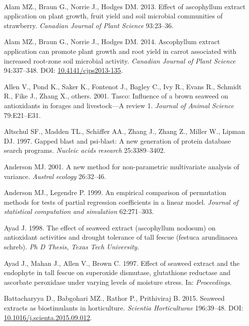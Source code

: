 \documentclass[11pt,]{article}
\begin{document}
~

\hypertarget{refs}{}
\hypertarget{ref-alam2013effect}{}
Alam MZ., Braun G., Norrie J., Hodges DM. 2013. Effect of ascophyllum
extract application on plant growth, fruit yield and soil microbial
communities of strawberry. \emph{Canadian Journal of Plant Science}
93:23--36.

\hypertarget{ref-Alam2014}{}
Alam MZ., Braun G., Norrie J., Hodges DM. 2014. Ascophyllum extract
application can promote plant growth and root yield in carrot associated
with increased root-zone soil microbial activity. \emph{Canadian Journal
of Plant Science} 94:337--348. DOI:
\href{https://doi.org/10.4141/cjps2013-135}{10.4141/cjps2013-135}.

\hypertarget{ref-allen2001tasco}{}
Allen V., Pond K., Saker K., Fontenot J., Bagley C., Ivy R., Evans R.,
Schmidt R., Fike J., Zhang X., others. 2001. Tasco: Influence of a brown
seaweed on antioxidants in forages and livestock---A review 1.
\emph{Journal of Animal Science} 79:E21--E31.

\hypertarget{ref-altschul1997gapped}{}
Altschul SF., Madden TL., Schäffer AA., Zhang J., Zhang Z., Miller W.,
Lipman DJ. 1997. Gapped blast and psi-blast: A new generation of protein
database search programs. \emph{Nucleic acids research} 25:3389--3402.

\hypertarget{ref-anderson2001new}{}
Anderson MJ. 2001. A new method for non-parametric multivariate analysis
of variance. \emph{Austral ecology} 26:32--46.

\hypertarget{ref-anderson1999empirical}{}
Anderson MJ., Legendre P. 1999. An empirical comparison of permutation
methods for tests of partial regression coefficients in a linear model.
\emph{Journal of statistical computation and simulation} 62:271--303.

\hypertarget{ref-ayad1998effect}{}
Ayad J. 1998. The effect of seaweed extract (ascophyllum nodosum) on
antioxidant activities and drought tolerance of tall fescue (festuca
arundinacea schreb). \emph{Ph D Thesis, Texas Tech University}.

\hypertarget{ref-ayad1997effect}{}
Ayad J., Mahan J., Allen V., Brown C. 1997. Effect of seaweed extract
and the endophyte in tall fescue on superoxide dismutase, glutathione
reductase and ascorbate peroxidase under varying levels of moisture
stress. In: \emph{Proceedings}.

\hypertarget{ref-Battacharyya2015}{}
Battacharyya D., Babgohari MZ., Rathor P., Prithiviraj B. 2015. Seaweed
extracts as biostimulants in horticulture. \emph{Scientia Horticulturae}
196:39--48. DOI:
\href{https://doi.org/10.1016/j.scienta.2015.09.012}{10.1016/j.scienta.2015.09.012}.
\end{document}
